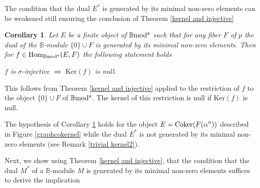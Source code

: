 \documentclass[12pt]{article}
\newtheorem{cor}[thm]{Corollary}
\def\Hom{{\rm Hom}}
\def\coker{{\rm Coker}}
\def\B{{\mathbb B}}
\def\ker{{\mbox{Ker}}}
\def\Hom {{\mbox{Hom}}}
\def\b2{{\rm \B mod^{\mathfrak s}}}
\begin{document}
   The condition that the  dual $E^*$ is generated by its minimal non-zero elements can be weakened still ensuring the conclusion of Theorem \ref{kernel and injective}
   \begin{cor}\label{trivial kernel1}  Let $E$ be a finite object of $\b2$ such  that for any fiber $F$ of $p$ the dual of the $\B$-module  	$\{0\}\cup F$ is generated by its minimal non-zero elements. Then for  $f\in \Hom_\b2(E,F)$ the following statement holds \vspace{.05in}
   
   \centerline{$f$ is $\sigma$-injective $\iff$ $\ker(f)$ is null.}   	
   \end{cor}
   \proof This follows from Theorem \ref{kernel and injective} applied to the restriction of $f$ to the object $\{0\}\cup F$ of $\b2$. The kernel of this restriction is null if $\ker(f)$ is null. \endproof 
   
    The hypothesis of Corollary \ref{trivial kernel1} holds for the  object $E=\coker(F(\alpha''))$ described in Figure \ref{graphcokernel} while  the  dual $E^*$ is not generated by its minimal non-zero elements (see Remark \ref{trivial kernel2}).\vspace{.05in}


Next, we show using Theorem \ref{kernel and injective}, that the condition that the dual $M^*$ of a $\B$-module $M$ is generated by its minimal non-zero elements suffices to derive the implication 
\end{document}
